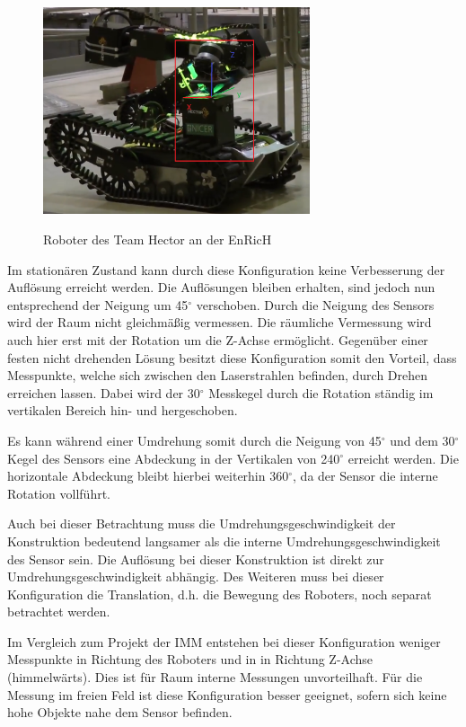\begin{figure}[H]
	\centering
	\includegraphics[width=0.7\textwidth]
	{resources/hector_cop.PNG}
	\caption[Roboter des Team Hector EnRicH]{Roboter des Team Hector an der EnRicH} \protect\cite{hector}
	\label{fig:hector}
\end{figure}

Im stationären Zustand kann durch diese Konfiguration keine Verbesserung der Auflösung erreicht werden. Die Auflösungen bleiben erhalten, sind jedoch nun entsprechend der Neigung um 45$^\circ$ verschoben. Durch die Neigung des Sensors wird der Raum nicht gleichmäßig vermessen. Die räumliche Vermessung wird auch hier erst mit der Rotation um die Z-Achse ermöglicht. Gegenüber einer festen nicht drehenden Lösung besitzt diese Konfiguration somit den Vorteil, dass Messpunkte, welche sich zwischen den Laserstrahlen befinden, durch Drehen erreichen lassen. Dabei wird der 30$^\circ$ Messkegel durch die Rotation ständig im vertikalen Bereich hin- und hergeschoben.

Es kann während einer Umdrehung somit durch die Neigung von 45$^\circ$ und dem 30$^\circ$ Kegel des Sensors eine Abdeckung in der Vertikalen von 240$^\circ$ erreicht werden. Die horizontale Abdeckung bleibt hierbei weiterhin 360$^\circ$, da der Sensor die interne Rotation vollführt.

Auch bei dieser Betrachtung  muss die Umdrehungsgeschwindigkeit der Konstruktion bedeutend langsamer als die interne Umdrehungsgeschwindigkeit des Sensor sein. Die Auflösung bei dieser Konstruktion ist direkt zur Umdrehungsgeschwindigkeit abhängig. Des Weiteren muss bei dieser Konfiguration die Translation, d.h. die Bewegung des Roboters, noch separat betrachtet werden.  

Im Vergleich zum Projekt der IMM entstehen bei dieser Konfiguration weniger Messpunkte in Richtung des Roboters und in in Richtung Z-Achse (himmelwärts). Dies ist für Raum interne Messungen unvorteilhaft. Für die Messung im freien Feld ist diese Konfiguration besser geeignet, sofern sich keine hohe Objekte nahe dem Sensor befinden. 
 	
